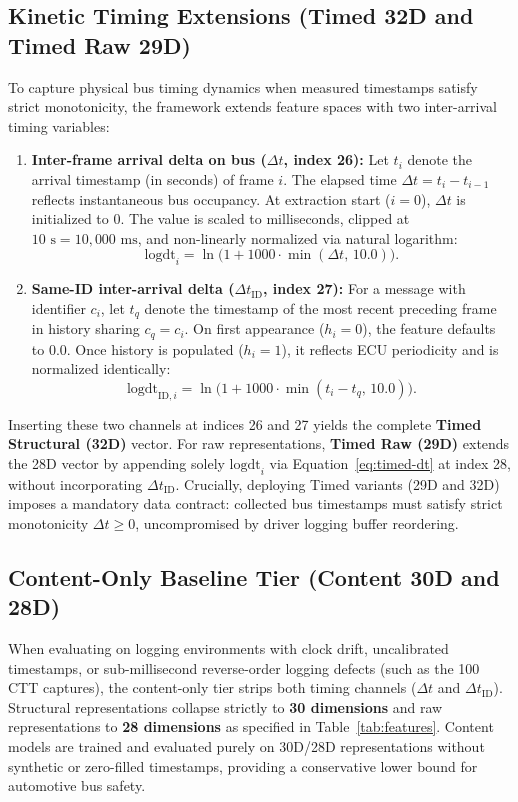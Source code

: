 \documentclass[12pt, a4paper, reqno, oneside]{book}
\begin{document}
\subsection{Kinetic Timing Extensions (Timed 32D and Timed Raw 29D)}\label{subsec:timed-features-def}
To capture physical bus timing dynamics when measured timestamps satisfy strict monotonicity, the framework extends feature spaces with two inter-arrival timing variables:
\begin{enumerate}
    \item \textbf{Inter-frame arrival delta on bus ($\Delta t$, index 26):} Let $t_i$ denote the arrival timestamp (in seconds) of frame $i$. The elapsed time $\Delta t = t_i - t_{i-1}$ reflects instantaneous bus occupancy. At extraction start ($i=0$), $\Delta t$ is initialized to $0$. The value is scaled to milliseconds, clipped at $10\text{ s} = 10{,}000\text{ ms}$, and non-linearly normalized via natural logarithm:
    \begin{equation}\label{eq:timed-dt}
    \text{logdt}_i = \ln\big(1 + 1000 \cdot \min(\Delta t,\, 10.0)\big).
    \end{equation}
    \item \textbf{Same-ID inter-arrival delta ($\Delta t_{\text{ID}}$, index 27):} For a message with identifier $c_i$, let $t_q$ denote the timestamp of the most recent preceding frame in history sharing $c_q = c_i$. On first appearance ($h_i = 0$), the feature defaults to $0.0$. Once history is populated ($h_i = 1$), it reflects ECU periodicity and is normalized identically:
    \begin{equation}\label{eq:timed-dt-id}
    \text{logdt}_{\text{ID}, i} = \ln\big(1 + 1000 \cdot \min(t_i - t_q,\, 10.0)\big).
    \end{equation}
\end{enumerate}
Inserting these two channels at indices 26 and 27 yields the complete \textbf{Timed Structural (32D)} vector. For raw representations, \textbf{Timed Raw (29D)} extends the 28D vector by appending solely $\text{logdt}_i$ via Equation~\eqref{eq:timed-dt} at index 28, without incorporating $\Delta t_{\text{ID}}$. Crucially, deploying Timed variants (29D and 32D) imposes a mandatory data contract: collected bus timestamps must satisfy strict monotonicity $\Delta t \ge 0$, uncompromised by driver logging buffer reordering.

\subsection{Content-Only Baseline Tier (Content 30D and 28D)}\label{subsec:content-features-def}
When evaluating on logging environments with clock drift, uncalibrated timestamps, or sub-millisecond reverse-order logging defects (such as the 100 CTT captures), the content-only tier strips both timing channels ($\Delta t$ and $\Delta t_{\text{ID}}$). Structural representations collapse strictly to \textbf{30 dimensions} and raw representations to \textbf{28 dimensions} as specified in Table~\ref{tab:features}. Content models are trained and evaluated purely on 30D/28D representations without synthetic or zero-filled timestamps, providing a conservative lower bound for automotive bus safety.
\end{document}
